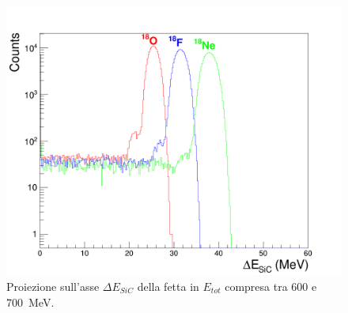 \begin{figure} [!t]
	\centering
	\includegraphics[width=\textwidth, keepaspectratio]{Grafici_Tesi/Particelle_non_monocromatiche/fetta_quadrata.png}
	\caption{Proiezione sull'asse $\Delta E_{SiC}$ della fetta in $E_{tot}$ compresa tra 600 e 700~MeV.} \label{fig:fetta}
\end{figure}



